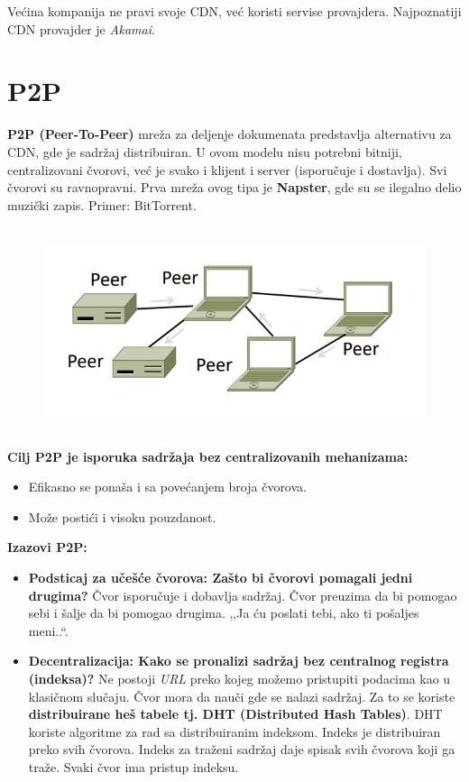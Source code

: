 \documentclass[a4paper]{article}
\begin{document}
    Većina kompanija ne pravi svoje CDN, već koristi servise provajdera. Najpoznatiji CDN
    provajder je \textit{Akamai}.

\section{P2P}
    \textbf{P2P (Peer-To-Peer)} mreža za deljenje dokumenata predstavlja alternativu za CDN,
    gde je sadržaj distribuiran. U ovom modelu nisu potrebni bitniji, centralizovani čvorovi,
    već je svako i klijent i server (isporučuje i dostavlja). Svi čvorovi su ravnopravni.
    Prva mreža ovog tipa je \textbf{Napster}, gde su se ilegalno delio muzički zapis. 
    Primer: BitTorrent.
    \begin{figure}[H]
        \begin{center}
            \includegraphics[width=120mm,height=60mm]{Slike/p2p1.png}
        \end{center}
    \end{figure}
    \noindent \textbf{Cilj P2P je isporuka sadržaja bez centralizovanih mehanizama:}
    \begin{itemize}
        \item Efikasno se ponaša i sa povećanjem broja čvorova.
        \item Može postići i visoku pouzdanost.
    \end{itemize}
    \textbf{Izazovi P2P:}
    \begin{itemize}
        \item \textbf{Podsticaj za učešće čvorova: Zašto bi čvorovi pomagali jedni drugima?}
              Čvor isporučuje i dobavlja sadržaj. Čvor preuzima da bi pomogao sebi i šalje
              da bi pomogao drugima. ,,Ja ću poslati tebi, ako ti pošaljes meni..``.
        \item \textbf{Decentralizacija: Kako se pronalizi sadržaj bez centralnog registra (indeksa)?}
              Ne postoji \textit{URL} preko kojeg možemo pristupiti podacima kao u klasičnom slučaju.
              Čvor mora da nauči gde se nalazi sadržaj. Za to se koriste \textbf{distribuirane heš
              tabele tj. DHT (Distributed Hash Tables)}. DHT koriste algoritme za rad sa distribuiranim
              indeksom. Indeks je distribuiran preko svih čvorova. Indeks za traženi sadržaj daje
              spisak svih čvorova koji ga traže. Svaki čvor ima pristup indeksu.
    \end{itemize}
\end{document}
